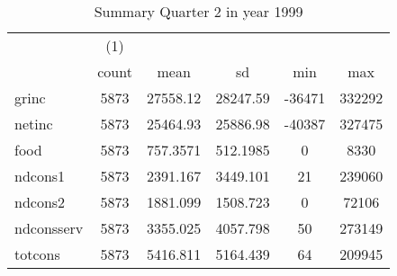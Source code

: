 \begin{table}[htbp]\centering
\def\sym#1{\ifmmode^{#1}\else\(^{#1}\)\fi}
\caption{Summary Quarter 2 in year 1999 \label{sum\_Q2\_y1999}}
\begin{tabular}{l*{1}{ccccc}}
\hline\hline
            &\multicolumn{1}{c}{(1)}&            &            &            &            \\
            &       count&        mean&          sd&         min&         max\\
\hline
grinc       &        5873&    27558.12&    28247.59&      -36471&      332292\\
netinc      &        5873&    25464.93&    25886.98&      -40387&      327475\\
food        &        5873&    757.3571&    512.1985&           0&        8330\\
ndcons1     &        5873&    2391.167&    3449.101&          21&      239060\\
ndcons2     &        5873&    1881.099&    1508.723&           0&       72106\\
ndconsserv  &        5873&    3355.025&    4057.798&          50&      273149\\
totcons     &        5873&    5416.811&    5164.439&          64&      209945\\
\hline\hline
\end{tabular}
\end{table}
